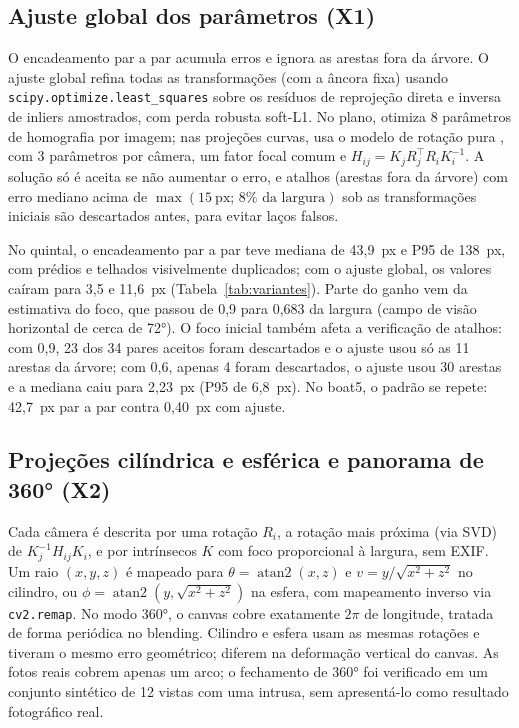 \documentclass[10pt,a4paper]{article}
\begin{document}
\subsection{Ajuste global dos parâmetros (X1)}
O encadeamento par a par acumula erros e ignora as arestas fora da árvore. O ajuste global refina todas as
transformações (com a âncora fixa) usando \texttt{scipy.optimize.least\_squares} sobre os resíduos de
reprojeção direta e inversa de inliers amostrados, com perda robusta soft-L1. No plano, otimiza 8
parâmetros de homografia por imagem; nas projeções curvas, usa o modelo de rotação pura \cite{brown2007},
com 3 parâmetros por câmera, um fator focal comum e $H_{ij} = K_j R_j^{\top} R_i K_i^{-1}$. A solução só é
aceita se não aumentar o erro, e atalhos (arestas fora da árvore) com erro mediano acima de
$\max(15~\text{px};\,8\%\text{ da largura})$ sob as transformações iniciais são descartados antes, para
evitar laços falsos.

No quintal, o encadeamento par a par teve mediana de 43,9~px e P95 de 138~px, com prédios e telhados
visivelmente duplicados; com o ajuste global, os valores caíram para 3,5 e 11,6~px
(Tabela~\ref{tab:variantes}). Parte do ganho vem da estimativa do foco, que passou de 0,9 para 0,683 da
largura (campo de visão horizontal de cerca de 72°). O foco inicial também afeta a verificação de atalhos:
com 0,9, 23 dos 34 pares aceitos foram descartados e o ajuste usou só as 11 arestas da árvore; com 0,6,
apenas 4 foram descartados, o ajuste usou 30 arestas e a mediana caiu para 2,23~px (P95 de 6,8~px). No
boat5, o padrão se repete: 42,7~px par a par contra 0,40~px com ajuste.

\subsection{Projeções cilíndrica e esférica e panorama de 360° (X2)}
Cada câmera é descrita por uma rotação $R_i$, a rotação mais próxima (via SVD) de $K_j^{-1}H_{ij}K_i$, e por
intrínsecos $K$ com foco proporcional à largura, sem EXIF. Um raio $(x,y,z)$ é mapeado para
$\theta = \operatorname{atan2}(x,z)$ e $v = y/\sqrt{x^2+z^2}$ no cilindro, ou
$\phi = \operatorname{atan2}(y,\sqrt{x^2+z^2})$ na esfera, com mapeamento inverso via \texttt{cv2.remap}.
No modo 360°, o canvas cobre exatamente $2\pi$ de longitude, tratada de forma periódica no blending.
Cilindro e esfera usam as mesmas rotações e tiveram o mesmo erro geométrico; diferem na deformação
vertical do canvas. As fotos reais cobrem apenas um arco; o fechamento de 360° foi verificado em um
conjunto sintético de 12 vistas com uma intrusa, sem apresentá-lo como resultado fotográfico real.
\end{document}
